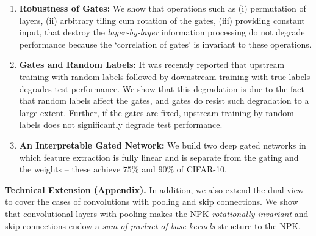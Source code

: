\begin{enumerate}
\item \textbf{Robustness of Gates:} We show that operations such as (i) permutation of layers, (ii) arbitrary tiling cum rotation of the gates, (iii) providing constant input, that destroy the \emph{layer-by-layer} information processing do not degrade performance because the `correlation of gates' is invariant to these operations.
\item \textbf{Gates and Random Labels:} It was recently reported  that upstream training with random labels followed by downstream training with true labels degrades test performance. We show that this degradation is due to the fact that random labels affect the gates, and gates do resist such degradation to a large extent. Further, if the gates are fixed, upstream training by random labels does not significantly degrade test performance.
\item \textbf{An Interpretable Gated Network:} We build two deep gated networks in which feature extraction is fully linear and is separate from the gating and the weights -- these achieve $75\%$ and $90\%$ of CIFAR-10.

\end{enumerate}
\textbf{Technical Extension (Appendix).} In addition, we also extend the dual view to cover the cases of convolutions with pooling and skip connections. We show that convolutional layers with pooling makes the NPK \emph{rotationally invariant} and skip connections endow a \emph{sum of product of base kernels} structure to the NPK.
\begin{comment}

CNN, Resnet to say that the framework can be extended successfully.

Perhaps the second important and powerful insights lie in the experimental implication contribution

why do we even care for a specific theory?

All through we differentiate from \cite{npk}
\end{comment}